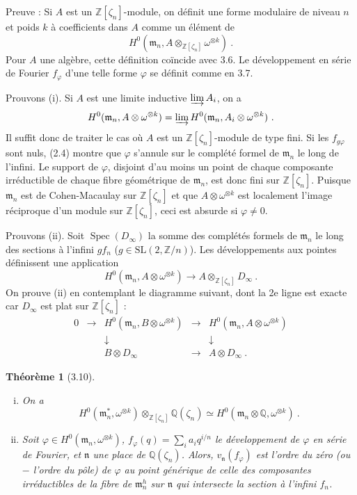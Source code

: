 \documentclass[12pt,a4paper]{amsart}
\theoremstyle{plain}
\newtheorem{theoreme}[proposition]{Th\'eor\`eme}
\theoremstyle{definition}
\theoremstyle{remark}
\DeclareMathOperator{\Spec}{Spec}
\newcommand{\ZZ}{\mathbb{Z}}
\newcommand{\QQ}{\mathbb{Q}}
\begin{document}
\noindent Preuve : Si $A$ est un $\ZZ[\zeta_n]$-module, on d\'efinit une forme modulaire de niveau $n$ et poids $k$ \`a coefficients dans $A$ comme un \'el\'ement de
\[
H^0(\mathfrak{m}_n, A \otimes_{\ZZ[\zeta_n]} \omega^{\otimes k}) \ .
\]
Pour $A$ une alg\`ebre, cette d\'efinition co\"incide avec 3.6. Le d\'eveloppement en s\'erie de Fourier $f_\varphi$ d'une telle forme $\varphi$ se d\'efinit comme en 3.7.

Prouvons (i). Si $A$ est une limite inductive $\varinjlim A_i$, on a
\[
H^0(\mathfrak{m}_n, A \otimes \omega^{\otimes k}) = \varinjlim H^0(\mathfrak{m}_n, A_i \otimes \omega^{\otimes k}) \ .
\]
Il suffit donc de traiter le cas o\`u $A$ est un $\ZZ[\zeta_n]$-module de type fini. Si les $f_{g\varphi}$ sont nuls, (2.4) montre que $\varphi$ s'annule sur le compl\'et\'e formel de $\mathfrak{m}_n$ le long de l'infini. Le support de $\varphi$, disjoint d'au moins un point de chaque composante irr\'eductible de chaque fibre g\'eom\'etrique de $\mathfrak{m}_n$, est donc fini sur $\ZZ[\zeta_n]$. Puisque $\mathfrak{m}_n$ est de Cohen-Macaulay sur $\ZZ[\zeta_n]$ et que $A \otimes \omega^{\otimes k}$ est localement l'image r\'eciproque d'un module sur $\ZZ[\zeta_n]$, ceci est absurde si $\varphi \neq 0$.

Prouvons (ii). Soit $\Spec(D_\infty)$ la somme des compl\'et\'es formels de $\mathfrak{m}_n$ le long des sections \`a l'infini $gf_n$ ($g \in \mathrm{SL}(2, \ZZ/n)$). Les d\'eveloppements aux pointes d\'efinissent une application
\[
H^0(\mathfrak{m}_n, A \otimes \omega^{\otimes k}) \longrightarrow A \otimes_{\ZZ[\zeta_n]} D_\infty \ .
\]
On prouve (ii) en contemplant le diagramme suivant, dont la 2e ligne est exacte car $D_\infty$ est plat sur $\ZZ[\zeta_n]$ :
\[
\begin{array}{cccccc}
0 & \longrightarrow & H^0(\mathfrak{m}_n, B \otimes \omega^{\otimes k}) & \longrightarrow & H^0(\mathfrak{m}_n, A \otimes \omega^{\otimes k}) \\
 & & \downarrow & & \downarrow \\
 & & B \otimes D_\infty & \longrightarrow & A \otimes D_\infty \ .
\end{array}
\]

\begin{theoreme}[3.10]
\begin{enumerate}[(i)]
\item On a
\[
H^0(\mathfrak{m}_n^*, \omega^{\otimes k}) \otimes_{\ZZ[\zeta_n]} \QQ(\zeta_n) \simeq H^0(\mathfrak{m}_n \otimes \QQ, \omega^{\otimes k}) \ .
\]

\item Soit $\varphi \in H^0(\mathfrak{m}_n, \omega^{\otimes k})$, $f_\varphi(q) = \sum_i a_i q^{i/n}$ le d\'eveloppement de $\varphi$ en s\'erie de Fourier, et $\mathfrak{n}$ une place de $\QQ(\zeta_n)$. Alors, $v_\mathfrak{n}(f_\varphi)$ est l'ordre du z\'ero (ou $-$ l'ordre du p\^ole) de $\varphi$ au point g\'en\'erique de celle des composantes irr\'eductibles de la fibre de $\mathfrak{m}_n^h$ sur $\mathfrak{n}$ qui intersecte la section \`a l'infini $f_n$.
\end{enumerate}
\end{theoreme}
\end{document}
